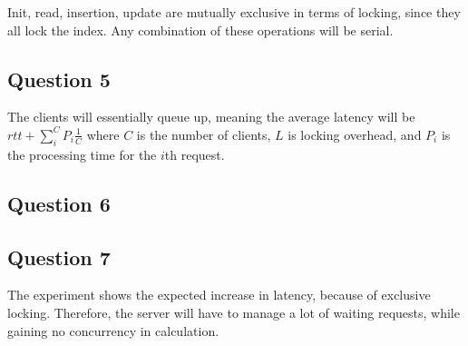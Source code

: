 \documentclass[11pt,a4paper]{article}
\begin{document}
Init, read, insertion, update are mutually exclusive in terms of locking, since
they all lock the index. Any combination of these operations will be serial.

\subsection{Question 5}

The clients will essentially queue up, meaning the average latency will be
$rtt + \sum_i^C P_i \frac 1 C$ where $C$ is the number of clients, $L$ is
locking overhead, and $P_i$ is the processing time for the $i$th request.




\subsection{Question 6}




\subsection{Question 7}
The experiment shows the expected increase in latency, because of exclusive locking.
Therefore, the server will have to manage a lot of waiting requests, while
gaining no concurrency in calculation.
\end{document}

